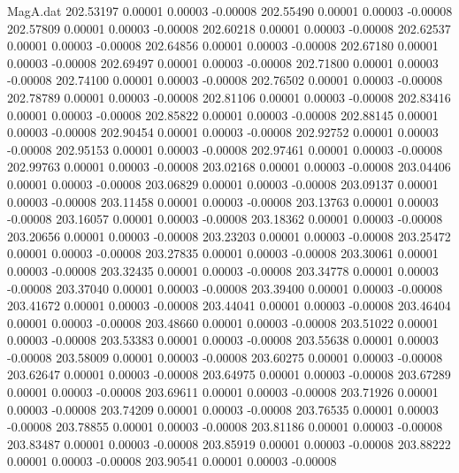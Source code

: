 \begin{filecontents}{MagA.dat}
 202.53197    0.00001    0.00003   -0.00008
 202.55490    0.00001    0.00003   -0.00008
 202.57809    0.00001    0.00003   -0.00008
 202.60218    0.00001    0.00003   -0.00008
 202.62537    0.00001    0.00003   -0.00008
 202.64856    0.00001    0.00003   -0.00008
 202.67180    0.00001    0.00003   -0.00008
 202.69497    0.00001    0.00003   -0.00008
 202.71800    0.00001    0.00003   -0.00008
 202.74100    0.00001    0.00003   -0.00008
 202.76502    0.00001    0.00003   -0.00008
 202.78789    0.00001    0.00003   -0.00008
 202.81106    0.00001    0.00003   -0.00008
 202.83416    0.00001    0.00003   -0.00008
 202.85822    0.00001    0.00003   -0.00008
 202.88145    0.00001    0.00003   -0.00008
 202.90454    0.00001    0.00003   -0.00008
 202.92752    0.00001    0.00003   -0.00008
 202.95153    0.00001    0.00003   -0.00008
 202.97461    0.00001    0.00003   -0.00008
 202.99763    0.00001    0.00003   -0.00008
 203.02168    0.00001    0.00003   -0.00008
 203.04406    0.00001    0.00003   -0.00008
 203.06829    0.00001    0.00003   -0.00008
 203.09137    0.00001    0.00003   -0.00008
 203.11458    0.00001    0.00003   -0.00008
 203.13763    0.00001    0.00003   -0.00008
 203.16057    0.00001    0.00003   -0.00008
 203.18362    0.00001    0.00003   -0.00008
 203.20656    0.00001    0.00003   -0.00008
 203.23203    0.00001    0.00003   -0.00008
 203.25472    0.00001    0.00003   -0.00008
 203.27835    0.00001    0.00003   -0.00008
 203.30061    0.00001    0.00003   -0.00008
 203.32435    0.00001    0.00003   -0.00008
 203.34778    0.00001    0.00003   -0.00008
 203.37040    0.00001    0.00003   -0.00008
 203.39400    0.00001    0.00003   -0.00008
 203.41672    0.00001    0.00003   -0.00008
 203.44041    0.00001    0.00003   -0.00008
 203.46404    0.00001    0.00003   -0.00008
 203.48660    0.00001    0.00003   -0.00008
 203.51022    0.00001    0.00003   -0.00008
 203.53383    0.00001    0.00003   -0.00008
 203.55638    0.00001    0.00003   -0.00008
 203.58009    0.00001    0.00003   -0.00008
 203.60275    0.00001    0.00003   -0.00008
 203.62647    0.00001    0.00003   -0.00008
 203.64975    0.00001    0.00003   -0.00008
 203.67289    0.00001    0.00003   -0.00008
 203.69611    0.00001    0.00003   -0.00008
 203.71926    0.00001    0.00003   -0.00008
 203.74209    0.00001    0.00003   -0.00008
 203.76535    0.00001    0.00003   -0.00008
 203.78855    0.00001    0.00003   -0.00008
 203.81186    0.00001    0.00003   -0.00008
 203.83487    0.00001    0.00003   -0.00008
 203.85919    0.00001    0.00003   -0.00008
 203.88222    0.00001    0.00003   -0.00008
 203.90541    0.00001    0.00003   -0.00008

\end{filecontents}
